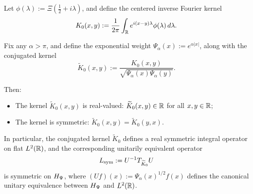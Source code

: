 \begin{lemma}
\label{lem:kernel_symmetry}
Let \( \phi(\lambda) := \Xi\left( \tfrac{1}{2} + i\lambda \right) \), and define the centered inverse Fourier kernel
\[
K_0(x,y) := \frac{1}{2\pi} \int_{\mathbb{R}} e^{i(x - y)\lambda} \phi(\lambda)\, d\lambda.
\]

Fix any \( \alpha > \pi \), and define the exponential weight \( \Psi_\alpha(x) := e^{\alpha |x|} \), along with the conjugated kernel
\[
\widetilde{K}_0(x,y) := \frac{K_0(x,y)}{\sqrt{\Psi_\alpha(x)\Psi_\alpha(y)}}.
\]

Then:
\begin{itemize}
    \item The kernel \( \widetilde{K}_0(x,y) \) is real-valued: \( \widetilde{K}_0(x,y) \in \mathbb{R} \) for all \( x, y \in \mathbb{R} \);
    \item The kernel is symmetric: \( \widetilde{K}_0(x,y) = \widetilde{K}_0(y,x) \).
\end{itemize}

\medskip
\noindent
In particular, the conjugated kernel \( \widetilde{K}_0 \) defines a real symmetric integral operator on flat \( L^2(\mathbb{R}) \), and the corresponding unitarily equivalent operator
\[
L_{\mathrm{sym}} := U^{-1} T_{\widetilde{K}_0} U
\]
is symmetric on \( H_{\Psi} \), where \( (U f)(x) := \Psi_\alpha(x)^{1/2} f(x) \) defines the canonical unitary equivalence between \( H_{\Psi} \) and \( L^2(\mathbb{R}) \).
\end{lemma}
